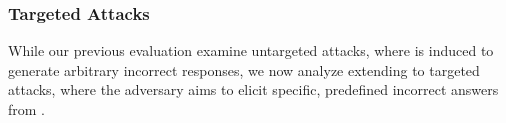 
\subsubsection{Targeted Attacks}

While our previous evaluation examine untargeted attacks, where \rag is induced to generate arbitrary incorrect responses, we now analyze extending \attack to targeted attacks, where the adversary aims to elicit specific, predefined incorrect answers from \rag.

